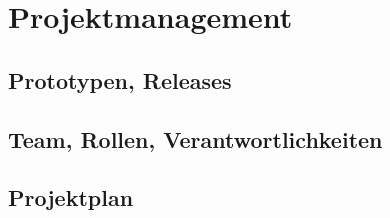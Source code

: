 \chapter{Projektmanagement}
\label{pm-projektmanagement}

\section{Prototypen, Releases}


\section{Team, Rollen, Verantwortlichkeiten}



\section{Projektplan}



